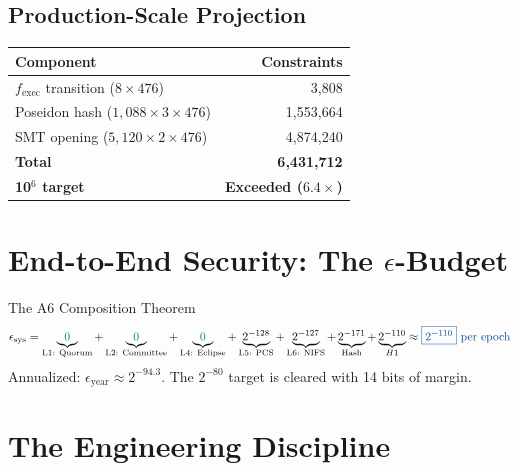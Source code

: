 \documentclass[11pt, a4paper]{article}
\begin{document}
\subsection{Production-Scale Projection}

\begin{table}[h]
\centering
{}
\begin{tabular}{lr}
\rowcolor{hsmaPurple!20} \textbf{Component} & \textbf{Constraints} \\
\midrule
 $f_{\text{exec}}$ transition ($8 \times 476$) & 3{,}808 \\
Poseidon hash ($1{,}088 \times 3 \times 476$) & 1{,}553{,}664 \\
SMT opening ($5{,}120 \times 2 \times 476$) & 4{,}874{,}240 \\
\midrule
\textbf{Total} & \textbf{6{,}431{,}712} \\
\textcolor{hsmaGreen}{\textbf{10$^6$ target}} & \textcolor{hsmaGreen}{\textbf{Exceeded ($6.4\times$)}} \\
\bottomrule
\end{tabular}
\end{table}

\section{End-to-End Security: The $\epsilon$-Budget}
\label{sec:security}

\begin{keybox}{The A6 Composition Theorem}
\begin{equation}
\epsilon_{\text{sys}} =
\underbrace{\textcolor{hsmaGreen}{0}}_{\text{L1: Quorum}} +
\underbrace{\textcolor{hsmaGreen}{0}}_{\text{L2: Committee}} +
\underbrace{\textcolor{hsmaGreen}{0}}_{\text{L4: Eclipse}} +
\underbrace{2^{-128}}_{\text{L5: PCS}} +
\underbrace{2^{-127}}_{\text{L6: NIFS}} +
\underbrace{2^{-171}}_{\text{Hash}} +
\underbrace{2^{-110}}_{H1}
\approx \color{hsmaBlue}\boxed{2^{-110}} \text{ per epoch}
\end{equation}
Annualized: $\epsilon_{\text{year}} \approx 2^{-94.3}$.
The $2^{-80}$ target is cleared with 14 bits of margin.
\end{keybox}

\section{The Engineering Discipline}
\label{sec:methodology}
\end{document}
